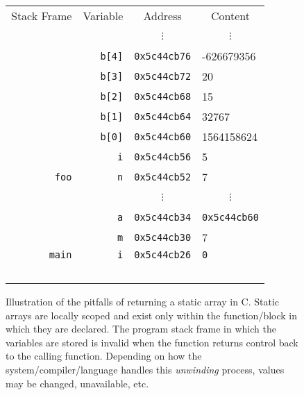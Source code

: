 \documentclass{article}
\begin{document}
\begin{figure}[h]
{\begin{tabular}{rr|l|l|}
\multicolumn{1}{c}{Stack Frame}  & \multicolumn{1}{c}{Variable} & \multicolumn{1}{c}{Address} & \multicolumn{1}{c}{Content} \\
\multicolumn{1}{c}{~} & \multicolumn{1}{c}{~} & \multicolumn{1}{c}{$\vdots$} & \multicolumn{1}{c}{$\vdots$}\\
\cline{3-4}
~ & \lstinline|b[4]| & \lstinline|0x5c44cb76| & -626679356 \\
\cline{3-4}
~ & \lstinline|b[3]| & \lstinline|0x5c44cb72| & 20 \\
\cline{3-4}
~ & \lstinline|b[2]| & \lstinline|0x5c44cb68| & 15 \\
\cline{3-4}
~ & \lstinline|b[1]| & \lstinline|0x5c44cb64| & 32767 \\
\cline{3-4}
~ & \lstinline|b[0]| & \lstinline|0x5c44cb60| & 1564158624 \\
\cline{3-4}
~ & \lstinline|i| & \lstinline|0x5c44cb56| & 5 \\
\cline{3-4}
\lstinline|foo| & \lstinline|n| & \lstinline|0x5c44cb52| & 7 \\
\cline{1-4}
~ & \multicolumn{1}{c}{~} & \multicolumn{1}{c}{$\vdots$} & \multicolumn{1}{c}{$\vdots$} \\
\cline{3-4}
~ & \lstinline|a| & \lstinline|0x5c44cb34| & \lstinline|0x5c44cb60| \\
\cline{3-4}
~ & \lstinline|m| & \lstinline|0x5c44cb30| & 7 \\
\cline{3-4}
\lstinline|main| & \lstinline|i| & \lstinline|0x5c44cb26| & \lstinline|0| \\
\cline{1-4}
~\\
\end{tabular}

}
\caption{Illustration of the pitfalls of returning a static array in C.  Static arrays are locally scoped and
exist only within the function/block in which they are declared.  The program stack frame in which
the variables are stored is invalid when the function returns control back to the calling function.  
Depending on how the system/compiler/language handles this \emph{unwinding} process, values
may be changed, unavailable, etc.}
\label{fig:returningStaticArrays}
\end{figure}
%
%
\end{document}
